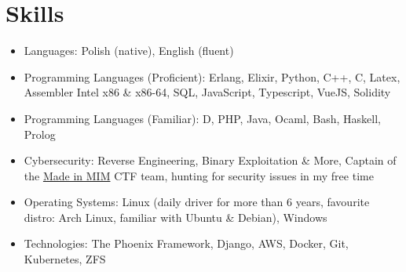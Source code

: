 \section{\sc Skills}
\begin{itemize}[leftmargin=0.16cm]
\setlength\itemsep{0em}
\item Languages: Polish (native), English (fluent)
\item Programming Languages (Proficient): Erlang, Elixir, Python, C++, C, Latex, Assembler Intel x86 \& x86-64, SQL, JavaScript, Typescript, VueJS, Solidity
\item Programming Languages (Familiar): D, PHP, Java, Ocaml, Bash, Haskell, Prolog
\item Cybersecurity: Reverse Engineering, Binary Exploitation \& More, Captain of the \href{https://ctftime.org/team/48557}{Made in MIM} CTF team, hunting for security issues in my free time
\item Operating Systems: Linux (daily driver for more than 6 years, favourite distro: Arch Linux, familiar with Ubuntu \& Debian), Windows
\item Technologies: The Phoenix Framework, Django, AWS, Docker, Git, Kubernetes, ZFS
\end{itemize}

